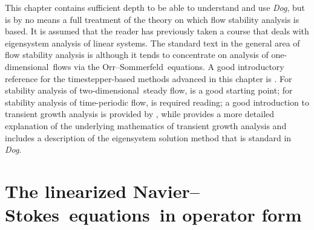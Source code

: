 \documentclass[11pt,a4paper]{report}
\newcommand\NavSto{Navier--Stokes}
\newcommand\LNS{linearized \NavSto}
\newcommand\LNSE{\LNS\ equations}
\newcommand\Orrsom{Orr--Sommerfeld}
\newcommand\oned{one-di\-men\-sion\-al}
\newcommand\twod{two-di\-men\-sion\-al}
\newcommand{\Dog}{\emph{Dog}}
\begin{document}
This chapter contains sufficient depth to be able to understand and
use \Dog, but is by no means a full treatment of the theory on which
flow stability analysis is based.  It is assumed that the reader has
previously taken a course that deals with eigensystem analysis of
linear systems.
%
The standard text in the general area of flow stability analysis is
\citet{schmid01} although it tends to concentrate on analysis of
\oned\ flows via the \Orrsom\ equations.
%
A good introductory reference for the timestepper-based methods
advanced in this chapter is \citet{tuba00}.
%
For stability analysis of \twod\ steady flow, \citet{bgh02} is a good
starting point; for stability analysis of time-periodic flow,
\cite{bah96} is required reading; a good introduction to transient
growth analysis is provided by \citet{bbs08a}, while \citet{bbs08b}
provides a more detailed explanation of the underlying mathematics of
transient growth analysis and includes a description of the
eigensystem solution method that is standard in \Dog.

\section{The \LNSE\ in operator form}
\end{document}
